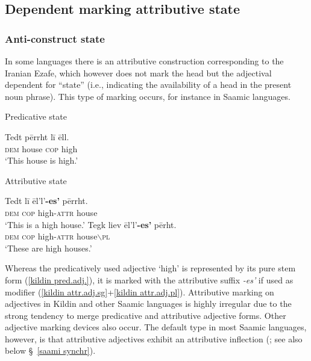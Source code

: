 \subsection{Dependent marking attributive state}\label{dep-marking state}
\subsubsection{Anti\hyp{}construct state} 
In some languages there is an attributive construction corresponding to the Iranian Ezafe, which however does not mark the head but the adjectival dependent for “state” (i.e., indicating the availability of a head in the present noun phrase). This type of marking occurs, for instance in Saamic languages.
\begin{exe}
\ex
{}
\begin{xlist}
\label{kildin pred.adj.}
\ex \rm{Predicative state}
\begin{xlist}
\ex
\gll Tedt 	pērrht l{ī} ēll.\\
	\textsc{dem} house \textsc{cop} high\\
\glt	‘This house is high.’
\end{xlist}
\ex \rm{Attributive state}
\begin{xlist}
\ex	
\label{kildin attr.adj.sg}
\gll Tedt	l{ī} 	ēl'l'\textbf{-es'} 		pērrht.\\
	\textsc{dem} \textsc{cop}	high-\textsc{attr}	house\\
\glt	‘This is a high house.’
\ex	
\label{kildin attr.adj.pl}
\gll Tegk 	liev 	ēl'l'\textbf{-es'}		pērht.\\	
	\textsc{dem}	\textsc{cop}	high-\textsc{attr} house$\backslash$\textsc{pl}\\
\glt	‘These are high houses.’
\end{xlist}
\end{xlist}
\end{exe}
Whereas the predicatively used adjective ‘high’ is represented by its pure stem form (\ref{kildin pred.adj.}), it is marked with the attributive suffix \textit{-es'} if used as modifier (\ref{kildin attr.adj.sg}+\ref{kildin attr.adj.pl}). Attributive marking on adjectives in Kildin and other Saamic languages is highly irregular due to the strong tendency to merge predicative and attributive adjective forms. Other adjective marking devices also occur. The default type in most Saamic languages, however, is that attributive adjectives exhibit an attributive inflection (\citealt{riesler2006b}; see also below \S~\ref{saami synchr}).

